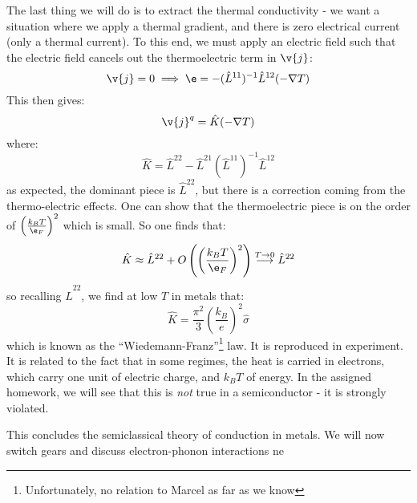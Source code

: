 The last thing we will do is to extract the thermal conductivity - we want a situation where we apply a thermal gradient, and there is zero electrical current (only a thermal current). To this end, we must apply an electric field such that the electric field cancels out the thermoelectric term in $\v{j}$:
\begin{equation}
    \v{j} = 0 \implies \e = -(\hat{L}^{11})^{-1}\hat{L}^{12}(-\nabla T)
\end{equation}
This then gives:
\begin{equation}
    \v{j}^q = \hat{K}(-\nabla T)
\end{equation}
where:
\begin{equation}
    \hat{K} = \hat{L}^{22} - \hat{L}^{21}(\hat{L}^{11})^{-1}\hat{L}^{12}
\end{equation}
as expected, the dominant piece is $\hat{L}^{22}$, but there is a correction coming from the thermo-electric effects. One can show that the thermoelectric piece is on the order of $\left(\frac{k_B T}{\e_F}\right)^2$ which is small. So one finds that:
\begin{equation}
    \hat{K} \approx \hat{L}^{22} + O\left(\left(\frac{k_B T}{\e_F}\right)^2\right) \stackrel{T \to 0}{\longrightarrow} \hat{L}^{22}
\end{equation}
so recalling $\hat{L}^{22}$, we find at low $T$ in metals that:
\begin{equation}
    \hat{K} = \frac{\pi^2}{3}\left(\frac{k_B}{e}\right)^2 \hat{\sigma}
\end{equation}
which is known as the ``Wiedemann-Franz''\footnote{Unfortunately, no relation to Marcel as far as we know} law. It is reproduced in experiment. It is related to the fact that in some regimes, the heat is carried in electrons, which carry one unit of electric charge, and $k_B T$ of energy. In the assigned homework, we will see that this is \emph{not} true in a semiconductor - it is strongly violated. 

This concludes the semiclassical theory of conduction in metals. We will now switch gears and discuss electron-phonon interactions ne